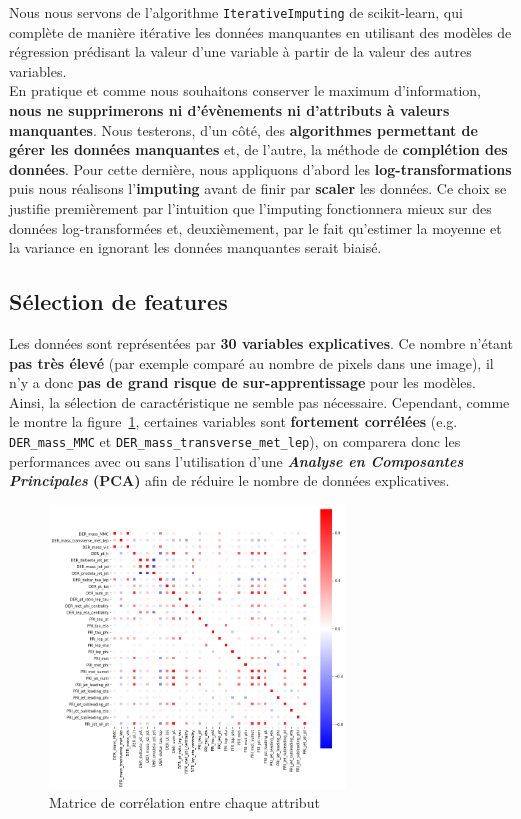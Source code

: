 \documentclass[12pt]{article}
\newcommand{\figref}[1]{figure~\ref{#1}}
\begin{document}
Nous nous servons de l’algorithme \texttt{IterativeImputing} de
scikit-learn, qui complète de manière itérative les données manquantes en
utilisant des modèles de régression prédisant la valeur d’une variable à partir
de la valeur des autres variables. \\

En pratique et comme nous souhaitons conserver le maximum d'information,
\textbf{nous ne supprimerons ni d'évènements ni d'attributs à valeurs
manquantes}. Nous testerons, d'un côté, des \textbf{algorithmes permettant de
gérer les données manquantes} et, de l'autre, la méthode de \textbf{complétion
des données}. Pour cette dernière, nous appliquons d'abord les
\textbf{log-transformations} puis nous réalisons l’\textbf{imputing} avant de
finir par \textbf{scaler} les données. Ce choix se justifie premièrement par
l’intuition que l’imputing fonctionnera mieux sur des données log-transformées
et, deuxièmement, par le fait qu’estimer la moyenne et la variance en ignorant
les données manquantes serait biaisé.

\subsection{Sélection de features}

Les données sont représentées par \textbf{30 variables explicatives}. Ce nombre
n’étant \textbf{pas très élevé} (par exemple comparé au nombre de pixels dans
une image), il n’y a donc \textbf{pas de grand risque de sur-apprentissage} pour
les modèles. Ainsi, la sélection de caractéristique ne semble pas nécessaire.
Cependant, comme le montre la \figref{img:corr-mat}, certaines variables sont
\textbf{fortement corrélées} (e.g. \texttt{DER\_mass\_MMC} et
\texttt{DER\_mass\_transverse\_met\_lep}), on comparera donc les performances
avec ou sans l’utilisation d’une \textbf{\emph{Analyse en Composantes
Principales} (PCA)} afin de réduire le nombre de données explicatives.

\begin{figure}[H]
    \center
    \includegraphics[width=0.7\textwidth]{images/correlation_matrix.png}
    \caption{Matrice de corrélation entre chaque attribut}
    \label{img:corr-mat}
\end{figure}
\end{document}
